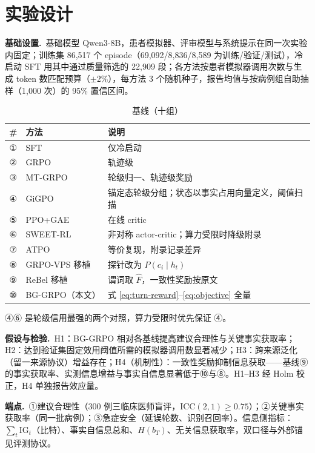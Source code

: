 \documentclass[11pt,a4paper]{ctexart}
\newcommand{\1}[1]{\mathbb{1}\!\left[#1\right]}
\newcommand{\Fhat}{\hat{F}}
\newcommand{\IG}{\mathrm{IG}}
\begin{document}
\section{实验设计}

\textbf{基础设置.}\ 基础模型 Qwen3-8B，患者模拟器、评审模型与系统提示在同一次实验内固定；训练集 86{,}517 个 episode（69{,}092/8{,}836/8{,}589 为训练/验证/测试），冷启动 SFT 用其中通过质量筛选的 22{,}909 段；各方法按患者模拟器调用次数与生成 token 数匹配预算（$\pm2\%$），每方法 3 个随机种子，报告均值与按病例组自助抽样（1{,}000 次）的 95\% 置信区间。

\begin{table}[h]\centering
\caption{基线（十组）}
\label{tab:baseline}
\begin{tabular}{cll}
\toprule
\# & 方法 & 说明 \\
\midrule
① & SFT & 仅冷启动 \\
② & GRPO & 轨迹级 \\
③ & MT-GRPO \cite{zeng2025mtgrpo} & 轮级归一、轨迹级奖励 \\
④ & GiGPO \cite{feng2025gigpo} & 锚定态轮级分组；状态以事实占用向量定义，阈值扫描 \\
⑤ & PPO+GAE & 在线 critic \\
⑥ & SWEET-RL \cite{pan2025sweetrl} & 非对称 actor-critic；算力受限时降级附录 \\
⑦ & ATPO \cite{cao2026atpo} & 等价复现，附录记录差异 \\
⑧ & GRPO-VPS \cite{grpovps2026} 移植 & 探针改为 $P(c_i\mid h_t)$ \\
⑨ & ReBel \cite{tang2026rebel} 移植 & 谓词取 $\Fhat$，一致性奖励按原文 \\
⑩ & BG-GRPO（本文） & 式 \eqref{eq:turn-reward}--\eqref{eq:objective} 全量 \\
\bottomrule
\end{tabular}
\end{table}

④⑥ 是轮级信用最强的两个对照，算力受限时优先保证 ④。

\textbf{假设与检验.}\ H1：BG-GRPO 相对各基线提高建议合理性与关键事实获取率；H2：达到验证集固定效用阈值所需的模拟器调用数显著减少；H3：跨来源泛化（留一来源协议）增益存在；H4（机制性）：一致性奖励抑制信息获取——基线⑨的事实获取率、实测信息增益与事实自信息显著低于⑩与⑧。H1--H3 经 Holm 校正，H4 单独报告效应量。

\textbf{端点.}\ ①建议合理性（300 例三临床医师盲评，$\mathrm{ICC}(2,1)\ge0.75$）；②关键事实获取率（同一批病例）；③急症安全（延误轮数、识别召回率）。信息侧指标：$\sum_t\IG_t$（比特）、事实自信息总和、$H(b_T)$、无关信息获取率，双口径与外部锚见评测协议。
\end{document}
